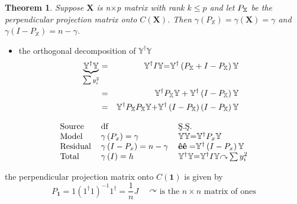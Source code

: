 \documentclass{article}
\newtheorem{theorem}{Theorem}
\begin{document}
\bigskip

\begin{theorem}
Suppose $\mathbf{X}$ is n$\times $p matrix with rank $k\leq p$ and let $P_{%
\mathbb{X}}$ be the perpendicular projection matrix onto $C\left( \mathbf{X}%
\right) $. Then $\gamma \left( P_{\mathbb{X}}\right) =\gamma \left( \mathbf{X%
}\right) =\gamma $ and $\gamma \left( I-P_{\mathbb{X}}\right) =n-\gamma $.
\end{theorem}

\begin{itemize}
\item the orthogonal decomposition of $\mathbb{Y}^{\dagger }\mathbb{Y}$%
\begin{eqnarray*}
\underset{\tsum y_{i}^{2}}{\underbrace{\mathbb{Y}^{\dagger }\mathbb{Y}}} &=&%
\mathbb{Y}^{\dagger }I\mathbb{Y}\mathbf{=}\mathbb{Y}^{\dagger }\left( P_{%
\mathbb{X}}+I-P_{\mathbb{X}}\right) \mathbb{Y} \\
&=&\mathbb{Y}^{\dagger }P_{\mathbb{X}}\mathbb{Y}+\mathbb{Y}^{\dagger }\left(
I-P_{\mathbb{X}}\right) \mathbb{Y} \\
&=&\mathbb{Y}^{\dagger }P_{\mathbb{X}}P_{\mathbb{X}}\mathbb{Y}\mathbf{+}%
\mathbb{Y}^{\dagger }\left( I-P_{\mathbb{X}}\right) \left( I-P_{\mathbb{X}%
}\right) \mathbb{Y}
\end{eqnarray*}
\end{itemize}

\begin{equation*}
\begin{tabular}{lll}
Source & df & \c{S}.\c{S}. \\ 
Model & $\gamma \left( P_{x}\right) =\gamma $ & $\mathbb{YY}\mathbf{=}%
\mathbb{Y}^{\dagger }P_{x}\mathbb{Y}$ \\ 
Residual & $\gamma \left( I-P_{x}\right) =n-\gamma $ & $\mathbf{\hat{e}\hat{e%
}=}\mathbb{Y}^{\dagger }\left( I-P_{x}\right) \mathbb{Y}$ \\ 
Total & $\gamma \left( I\right) =h$ & $\mathbb{Y}^{\dagger }\mathbb{Y}%
\mathbf{=}\mathbb{Y}^{\dagger }I\mathbb{Y}\mathbf{\curvearrowright }\tsum
y_{i}^{2}$%
\end{tabular}%
\end{equation*}

\bigskip

the perpendicular projection matrix onto $C\left( \boldsymbol{1}\right) $ is
given by%
\begin{equation*}
P_{\boldsymbol{1}}=1\left( 1^{\dagger }1\right) ^{-1}1^{\dagger }=\frac{1}{n}%
J\quad \curvearrowright \text{is the }n\times n\text{ matrix of ones}
\end{equation*}
\end{document}
